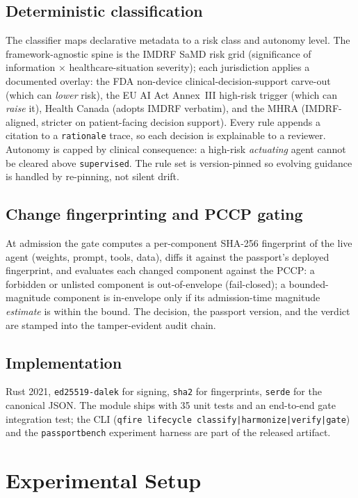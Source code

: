 \documentclass[11pt]{article}
\begin{document}
\subsection{Deterministic classification}
The classifier maps declarative metadata to a risk class and autonomy level. The
framework-agnostic spine is the IMDRF SaMD risk grid (significance of information
$\times$ healthcare-situation severity); each jurisdiction applies a documented
overlay: the FDA non-device clinical-decision-support carve-out (which can
\emph{lower} risk), the EU AI Act Annex~III high-risk trigger (which can \emph{raise}
it), Health Canada (adopts IMDRF verbatim), and the MHRA (IMDRF-aligned, stricter on
patient-facing decision support). Every rule appends a citation to a
\texttt{rationale} trace, so each decision is explainable to a reviewer. Autonomy is
capped by clinical consequence: a high-risk \emph{actuating} agent cannot be cleared
above \texttt{supervised}. The rule set is version-pinned so evolving guidance is
handled by re-pinning, not silent drift.

\subsection{Change fingerprinting and PCCP gating}
At admission the gate computes a per-component SHA-256 fingerprint of the live agent
(weights, prompt, tools, data), diffs it against the passport's deployed fingerprint,
and evaluates each changed component against the PCCP: a forbidden or unlisted
component is out-of-envelope (fail-closed); a bounded-magnitude component is in-envelope
only if its admission-time magnitude \emph{estimate} is within the bound. The decision,
the passport version, and the verdict are stamped into the tamper-evident audit chain.

\subsection{Implementation}
Rust 2021, \texttt{ed25519-dalek} for signing, \texttt{sha2} for fingerprints,
\texttt{serde} for the canonical JSON. The module ships with 35 unit tests and an
end-to-end gate integration test; the CLI (\texttt{qfire lifecycle
classify|harmonize|verify|gate}) and the \texttt{passportbench} experiment harness are
part of the released artifact.

\section{Experimental Setup}
\end{document}
